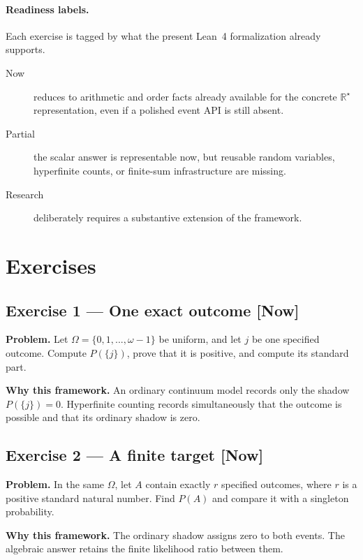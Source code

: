 \documentclass[11pt]{article}
\newcommand{\Rstar}{\mathbb{R}^{\star}}
\begin{document}
\paragraph{Readiness labels.} Each exercise is tagged by what the present
Lean~4 formalization already supports.
\begin{description}
\item[Now] reduces to arithmetic and order facts already available for the
concrete $\Rstar$ representation, even if a polished event API is still absent.
\item[Partial] the scalar answer is representable now, but reusable random
variables, hyperfinite counts, or finite-sum infrastructure are missing.
\item[Research] deliberately requires a substantive extension of the framework.
\end{description}


\section*{Exercises}


\subsection*{Exercise 1 --- One exact outcome \hfill \normalfont\small[Now]}

\textbf{Problem.} Let $\Omega = \{0, 1, ..., \omega - 1\}$ be uniform, and let $j$ be
one specified outcome. Compute $P(\{j\})$, prove that it is positive, and compute
its standard part.

\textbf{Why this framework.} An ordinary continuum model records only the shadow
$P(\{j\}) = 0$. Hyperfinite counting records simultaneously that the outcome is
possible and that its ordinary shadow is zero.


\subsection*{Exercise 2 --- A finite target \hfill \normalfont\small[Now]}

\textbf{Problem.} In the same $\Omega$, let $A$ contain exactly $r$ specified
outcomes, where $r$ is a positive standard natural number. Find $P(A)$ and
compare it with a singleton probability.

\textbf{Why this framework.} The ordinary shadow assigns zero to both events. The
algebraic answer retains the finite likelihood ratio between them.
\end{document}
